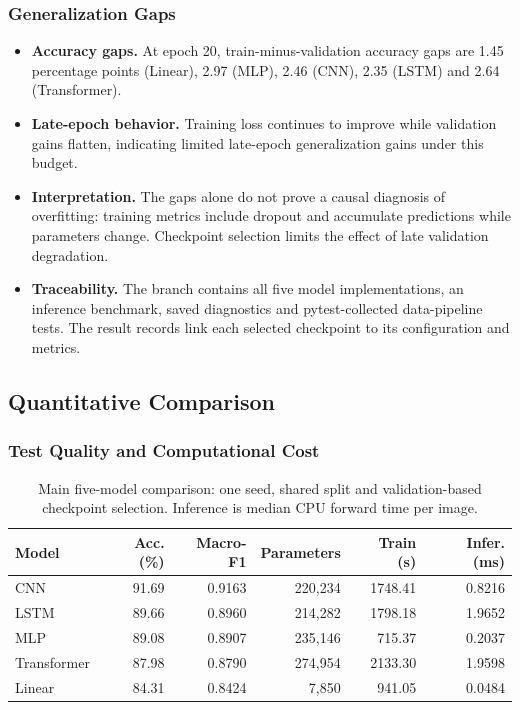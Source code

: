 \subsubsection{Generalization Gaps}
\begin{itemize}
\setlength{\itemsep}{3pt}
\setlength{\parskip}{0pt}
\item \textbf{Accuracy gaps.} At epoch 20, train-minus-validation accuracy gaps are 1.45 percentage points (Linear), 2.97 (MLP), 2.46 (CNN), 2.35 (LSTM) and 2.64 (Transformer).
\item \textbf{Late-epoch behavior.} Training loss continues to improve while validation gains flatten, indicating limited late-epoch generalization gains under this budget.
\item \textbf{Interpretation.} The gaps alone do not prove a causal diagnosis of overfitting: training metrics include dropout and accumulate predictions while parameters change. Checkpoint selection limits the effect of late validation degradation.

\item \textbf{Traceability.} The branch contains all five model implementations, an inference benchmark, saved diagnostics and pytest-collected data-pipeline tests. The result records link each selected checkpoint to its configuration and metrics.
\end{itemize}

\subsection{Quantitative Comparison}
\subsubsection{Test Quality and Computational Cost}
\begin{table}[!htbp]\centering\small
\caption{Main five-model comparison: one seed, shared split and validation-based checkpoint selection. Inference is median CPU forward time per image.}
\label{tab:finalcomparison}
\begin{tabular}{@{}lrrrrr@{}}\toprule
Model & Acc. (\%) & Macro-F1 & Parameters & Train (s) & Infer. (ms)\\\midrule
CNN & 91.69 & 0.9163 & 220,234 & 1748.41 & 0.8216 \\
LSTM & 89.66 & 0.8960 & 214,282 & 1798.18 & 1.9652 \\
MLP & 89.08 & 0.8907 & 235,146 & 715.37 & 0.2037 \\
Transformer & 87.98 & 0.8790 & 274,954 & 2133.30 & 1.9598 \\
Linear & 84.31 & 0.8424 & 7,850 & 941.05 & 0.0484 \\
\bottomrule\end{tabular}\end{table}


